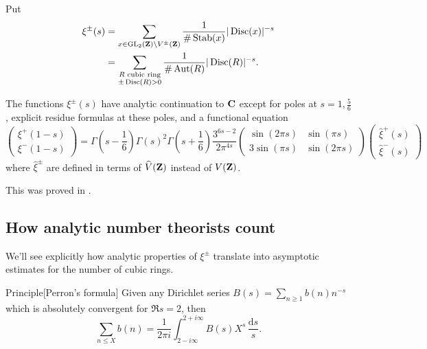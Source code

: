 \begin{defi}[Shintani]
Put 
\begin{align*}
  \xi^\pm(s) 
    &= \sum_{x\in \operatorname{GL}_2(\mathbf{Z})\backslash V^\pm(\mathbf{Z})} \frac{1}{\#\operatorname{Stab}(x)}|\operatorname{Disc}(x)|^{-s} \\
    &= \sum_{\substack{R\text{ cubic ring} \\ 
  \pm \operatorname{Disc}(R)>0}} \frac{1}{\#\operatorname{Aut}(R)} |\operatorname{Disc}(R)|^{-s} . 
\end{align*}
\end{defi}

\begin{theo}[Shintani]
The functions $\xi^\pm(s)$ have analytic continuation to $\mathbf{C}$ except for 
poles at $s=1,\frac 5 6$, explicit residue formulas at these poles, and a 
functional equation 
\[
  \begin{pmatrix} \xi^+(1-s) \\ \xi^-(1-s) \end{pmatrix} = \Gamma\left(s-\frac 1 6\right)\Gamma(s)^2 \Gamma\left(s+\frac 1 6\right) \frac{3^{6 s-2}}{2\pi^{4 s}} \begin{pmatrix} \sin(2\pi s) & \sin(\pi s) \\ 3\sin(\pi s) & \sin(2\pi s)\end{pmatrix} \begin{pmatrix} \widehat \xi^+(s) \\ \widehat\xi^-(s) \end{pmatrix} 
\]
where $\widehat\xi^\pm$ are defined in terms of $\widehat V(\mathbf{Z})$ instead of 
$V(\mathbf{Z})$. 
\end{theo}
This was proved in \cite{s72}. 





\subsection{How analytic number theorists count}

We'll see explicitly how analytic properties of $\xi^\pm$ translate into 
asymptotic estimates for the number of cubic rings. 

\begin{enonce}{Principle}[Perron's formula]
Given any Dirichlet series $B(s)=\sum_{n\geqslant 1} b(n) n^{-s}$ which is 
absolutely convergent for $\Re s=2$, then 
\[
  \sum_{n\leqslant X} b(n) = \frac{1}{2\pi i}\int_{2-i\infty}^{2+i\infty} B(s) X^s \, \frac{\mathrm{d}s}{s} .
\]
\end{enonce}

